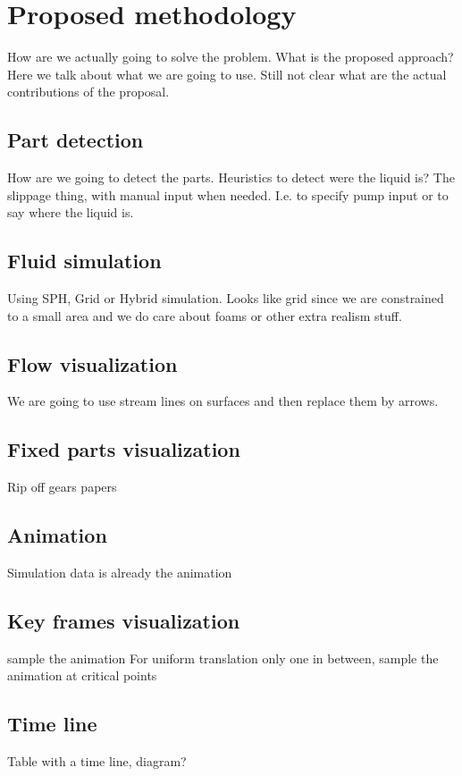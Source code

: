 \chapter{Proposed methodology}

How are we actually going to solve the problem.
What is the proposed approach?
Here we talk about what we are going to use.
Still not clear what are the actual contributions of the proposal.

\section{Part detection}

How are we going to detect the parts.
Heuristics to detect were the liquid is?
The slippage thing, with manual input when needed.
I.e. to specify pump input or to say where the liquid is.

\section{Fluid simulation}

Using SPH, Grid or Hybrid simulation.
Looks like grid since we are constrained to a small area and we do care about foams or other extra realism stuff.

\section{Flow visualization}

We are going to use stream lines on surfaces and then replace them by arrows.

\section{Fixed parts visualization}

Rip off gears papers

\section{Animation}

Simulation data is already the animation

\section{Key frames visualization}

sample the animation
For uniform translation only one in between, sample the animation at critical points

\section{Time line}

Table with a time line, diagram?